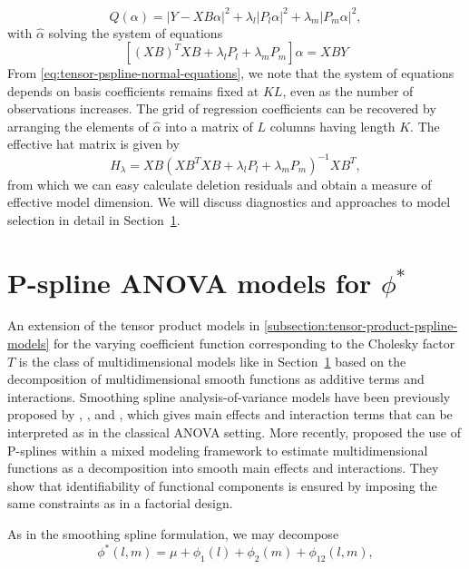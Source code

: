 \documentclass[12pt]{article}
\theoremstyle{definition}
\begin{document}
\begin{equation} \label{eq:tensor-pspline-objective-function}
Q\left(\alpha\right) = \vert Y - XB\alpha \vert^2 + \lambda_l \vert P_l \alpha \vert^2 + \lambda_m \vert P_m \alpha \vert^2,
\end{equation}
\noindent
with $\hat{\alpha}$ solving the system of equations 
\begin{equation} \label{eq:tensor-pspline-normal-equations}
\left[ \left(XB\right)^T XB +  \lambda_l P_l+ \lambda_m P_m\right]\alpha = X B Y
\end{equation}
\noindent
From \ref{eq:tensor-pspline-normal-equations}, we note that the system of equations depends on basis coefficients remains fixed at $KL$, even as the number of observations increases.   The grid of regression coefficients can be recovered by arranging the elements of $\hat{\alpha}$ into a matrix of $L$ columns having length $K$. The effective hat matrix is given by 
\[
H_\lambda = X B\left(X B^T X B +  \lambda_l P_l + \lambda_m P_m \right)^{-1} X B^T,
\]
from which we can easy calculate deletion residuals and obtain a measure of effective model dimension. We will discuss diagnostics and approaches to model selection in detail in Section~\ref{}.

\section{P-spline ANOVA models for $\phi^*$}

An extension of the tensor product models in \ref{subsection:tensor-product-pspline-models} for the varying coefficient function corresponding to the Cholesky factor $T$ is the class of multidimensional models like in Section~\ref{} based on the decomposition of multidimensional smooth functions as additive terms and interactions. Smoothing spline analysis-of-variance models have been previously proposed by \citet{gu1993semiparametric}, \citet{wahba1995smoothing}, and \citet{gu2002smoothing}, which gives main effects and interaction terms that can be interpreted as in the classical ANOVA setting. More recently, \citet{lee2011p} proposed the use of P-splines within a mixed modeling framework to estimate multidimensional functions as a decomposition into smooth main effects and interactions. They show that identifiability of functional components is ensured by imposing the same constraints as in a factorial design. 

As in the smoothing spline formulation, we may decompose
\[
\phi^*\left(l,m\right) = \mu + \phi_1\left(l\right) + \phi_2\left(m\right) + \phi_{12}\left(l,m\right),
\] 
\end{document}
